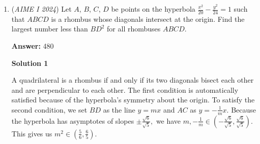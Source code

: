\begin{enumerate}
 $BC = (x+y+2(8-1)) \times 34 = (x+y+2(2024-1)) \times 1 = (x+y+2(1-1)) \times r$

 We can find that $x+y = \frac{1190}{11}$ . Now, let $(x+y+2(2024-1)) \times 1 = (x+y+2(1-1)) \times r$. 

 Substituting $x+y = \frac{1190}{11}$ in, we find that 
 \[r = \frac{192}{5} \implies \boxed{197}.\]




\textbf{Solution 5 (one variable)}

Define $I, x_1, x_8, y_1, y_{2024}$ to be the incenter and centers of the first and last circles of the $8$ and $2024$ tangent circles to $BC,$ and define $r$ to be the inradius of triangle $\bigtriangleup ABC.$ We calculate $\overline{x_1x_8} = 34 \cdot 14$ and $\overline{y_1y_{2024}} = 1 \cdot 4046$ because connecting the center of the circles voids two extra radii.

 
We can easily see that $B, x_1, y_1,$ and $I$ are collinear, and the same follows for $C, x_8, y_{2024},$ and $I$ (think angle bisectors).

 
We observe that triangles $\bigtriangleup I x_1 x_8$ and $\bigtriangleup I y_1 y_{2024}$ are similar, and therefore the ratio of the altitude to the base is the same, so we note

 
 \[\frac{\text{altitude}}{\text{base}} = \frac{r-34}{34\cdot 14} = \frac{r-1}{1\cdot 4046}.\]

 
Solving yields $r = \frac{192}{5},$ so the answer is $192+5 = \boxed{197}.$

 -\href{https://artofproblemsolving.com/wiki/index.php/User:Spectraldragon8}{spectraldragon8}

 


	\item (\textit{AIME I 2024}) Let $A$, $B$, $C$, $D$ be points on the hyperbola  $\frac{x^2}{20}-\frac{y^2}{24}=1$ such that $ABCD$ is a rhombus whose diagonals intersect at the origin. Find the largest number less than $BD^2$ for all rhombuses $ABCD$.


 
 \textbf{Answer: }480



\textbf{Solution 1}

A quadrilateral is a rhombus if and only if its two diagonals bisect each other and are perpendicular to each other. The first condition is automatically satisfied because of the hyperbola's symmetry about the origin. To satisfy the second condition, we set $BD$ as the line $y = mx$ and $AC$ as $y = -\frac{1}{m}x.$ Because the hyperbola has asymptotes of slopes $\pm \frac{\sqrt6}{\sqrt5},$ we have $m, -\frac{1}{m} \in \left(-\frac{\sqrt6}{\sqrt5}, \frac{\sqrt6}{\sqrt5}\right).$ This gives us $m^2 \in \left(\frac{5}{6}, \frac{6}{5}\right).$


\end{enumerate}
